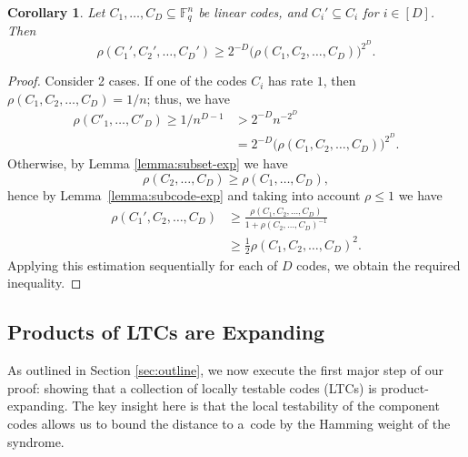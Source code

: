 \documentclass[conference]{IEEEtran}
\newcommand{\bigrbr}[1]{\bigl(#1\bigr)}
\let\le\leqslant
\let\ge\geqslant
\theoremstyle{plain}
\newtheorem{corollary}[theorem]{Corollary}
\theoremstyle{definition}
\theoremstyle{remark}
\newcommand{\F}{\mathbb{F}}
\begin{document}
\begin{corollary}\label{sled:subcodes}
Let $C_1,\dots,C_D\subseteq \F_q^n$ be linear codes, and $C_i' \subseteq C_i$ for $i \in [D]$. Then 
\[\rho(C_1',C_2',\dots,C_D') \ge 2^{-D}\bigrbr{\rho(C_1,C_2,\dots,C_D)}^{2^D}.\]    
\end{corollary}
\begin{proof}
    Consider 2 cases. 
    If one of the codes $C_i$ has rate $1$, then $\rho(C_1,C_2,\dots,C_D)=1/n$; thus, we have
        \begin{align*}            
            \rho(C'_1,\dots,C'_D)\ge 1/n^{D-1}&>2^{-D}n^{-2^D}\\
            &=2^{-D}\bigrbr{\rho(C_1,C_2,\dots,C_D)}^{2^D}.
        \end{align*}
        Otherwise, by Lemma \ref{lemma:subset-exp} we have \[
            \rho(C_2,\dots,C_D) \ge \rho(C_1,\dots,C_D),
        \] hence by Lemma~\ref{lemma:subcode-exp} and taking into account $\rho\le 1$ we have 
        \begin{align*}
            \rho(C_1',C_2,\dots,C_D) 
            &\ge \frac{\rho(C_1,C_2,\dots,C_D)}{1+\rho(C_2,\dots,C_D)^{-1}}\\
            &\ge \frac12\rho(C_1,C_2,\dots,C_D)^2.
        \end{align*}
        Applying this estimation sequentially for each of $D$ codes, we obtain the required inequality.
\end{proof}



\subsection{Products of LTCs are Expanding}

As outlined in Section \ref{sec:outline}, we now execute the first major step of our proof: showing that a collection of locally testable codes (LTCs) is product-expanding. The key insight here is that the local testability of the component codes allows us to bound the distance to a~code by the Hamming weight of the syndrome.
\end{document}
